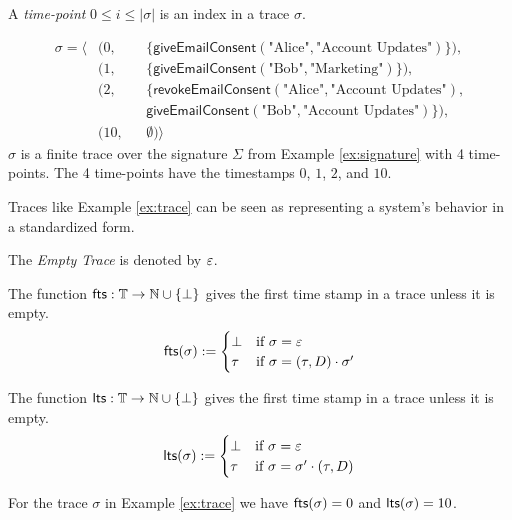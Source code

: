 \begin{definition}
    \label{def:time-point}
    A \emph{time-point} $0 \leq i \leq |\sigma|$ is an index in a trace $\sigma$.
\end{definition}

\begin{example}
    \label{ex:trace}
    \begin{align*}
        \sigma =
        \langle
        &(0, &&\{\mathsf{giveEmailConsent}(\text{"Alice"}, \text{"Account Updates"})\}), \\
        &(1, &&\{\mathsf{giveEmailConsent}(\text{"Bob"}, \text{"Marketing"})\}), \\
        &(2, &&\{\mathsf{revokeEmailConsent}(\text{"Alice"}, \text{"Account Updates"}), \\
             &&&\mathsf{giveEmailConsent}(\text{"Bob"}, \text{"Account Updates"})\}), \\
        &(10, &&\emptyset)
        \rangle
    \end{align*}
    $\sigma$ is a finite trace over the signature $\Sigma$ from Example
    \ref{ex:signature} with 4 time-points.
    The 4 time-points have the timestamps $0$, $1$, $2$, and $10$.
\end{example}
Traces like Example \ref{ex:trace} can be seen as representing
a system's behavior in a standardized form.

\begin{definition}
    \label{def:empty-trace}
    The \emph{Empty Trace} is denoted by $\varepsilon$.
\end{definition}

\begin{definition}
    \label{def:first-time-stamp}
    The function $\mathsf{fts} : \mathbb{T} \to \mathbb{N} \cup \left\{ \bot \right\}$
    gives the first time stamp in a trace unless it is empty.
    \begin{align*}
        \mathsf{fts}(\sigma) :=
        \begin{cases}
            \bot & \text{if } \sigma = \varepsilon \\
            \tau & \text{if } \sigma = \left( \tau, D \right) \cdot \sigma'
        \end{cases}
    \end{align*}
\end{definition}
\begin{definition}
    \label{def:last-time-stamp}
    The function $\mathsf{lts} : \mathbb{T} \to \mathbb{N} \cup \left\{ \bot \right\}$
    gives the first time stamp in a trace unless it is empty.
    \begin{align*}
        \mathsf{lts}(\sigma) :=
        \begin{cases}
            \bot & \text{if } \sigma = \varepsilon \\
            \tau & \text{if } \sigma = \sigma' \cdot \left( \tau, D \right)
        \end{cases}
    \end{align*}
\end{definition}
For the trace $\sigma$ in Example \ref{ex:trace} we have
$\mathsf{fts}(\sigma) = 0$ and $\mathsf{lts}(\sigma) = 10$.

